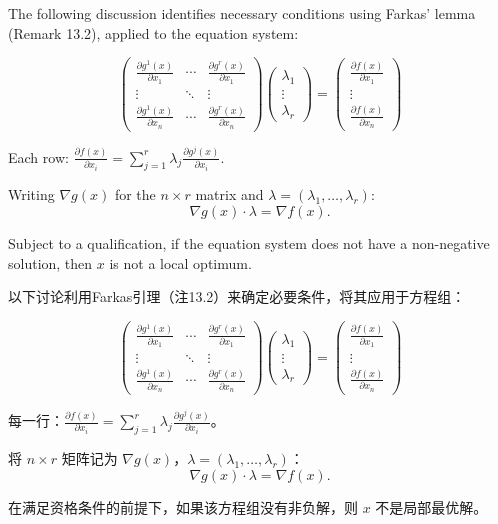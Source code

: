 \begin{original}
The following discussion identifies necessary conditions using Farkas' lemma (Remark 13.2), applied to the equation system:

\[
\begin{pmatrix}
\frac{\partial g^1(x)}{\partial x_1} & \cdots & \frac{\partial g^r(x)}{\partial x_1} \\
\vdots & \ddots & \vdots \\
\frac{\partial g^1(x)}{\partial x_n} & \cdots & \frac{\partial g^r(x)}{\partial x_n}
\end{pmatrix}
\begin{pmatrix} \lambda_1 \\ \vdots \\ \lambda_r \end{pmatrix}
=
\begin{pmatrix} \frac{\partial f(x)}{\partial x_1} \\ \vdots \\ \frac{\partial f(x)}{\partial x_n} \end{pmatrix} \tag{13.3}
\]

Each row: $\frac{\partial f(x)}{\partial x_i} = \sum_{j=1}^r \lambda_j \frac{\partial g^j(x)}{\partial x_i}$. 

Writing $\nabla g(x)$ for the $n \times r$ matrix and $\lambda = (\lambda_1,\dots,\lambda_r)$:
\[
\nabla g(x) \cdot \lambda = \nabla f(x). \tag{13.5}
\]

Subject to a qualification, if the equation system does not have a non-negative solution, then $x$ is not a local optimum.
\end{original}
\begin{translation}
以下讨论利用Farkas引理（注13.2）来确定必要条件，将其应用于方程组：

\[
\begin{pmatrix}
\frac{\partial g^1(x)}{\partial x_1} & \cdots & \frac{\partial g^r(x)}{\partial x_1} \\
\vdots & \ddots & \vdots \\
\frac{\partial g^1(x)}{\partial x_n} & \cdots & \frac{\partial g^r(x)}{\partial x_n}
\end{pmatrix}
\begin{pmatrix} \lambda_1 \\ \vdots \\ \lambda_r \end{pmatrix}
=
\begin{pmatrix} \frac{\partial f(x)}{\partial x_1} \\ \vdots \\ \frac{\partial f(x)}{\partial x_n} \end{pmatrix} \tag{13.3}
\]

每一行：$\frac{\partial f(x)}{\partial x_i} = \sum_{j=1}^r \lambda_j \frac{\partial g^j(x)}{\partial x_i}$。

将 $n \times r$ 矩阵记为 $\nabla g(x)$，$\lambda = (\lambda_1,\dots,\lambda_r)$：
\[
\nabla g(x) \cdot \lambda = \nabla f(x). \tag{13.5}
\]

在满足资格条件的前提下，如果该方程组没有非负解，则 $x$ 不是局部最优解。
\end{translation}

